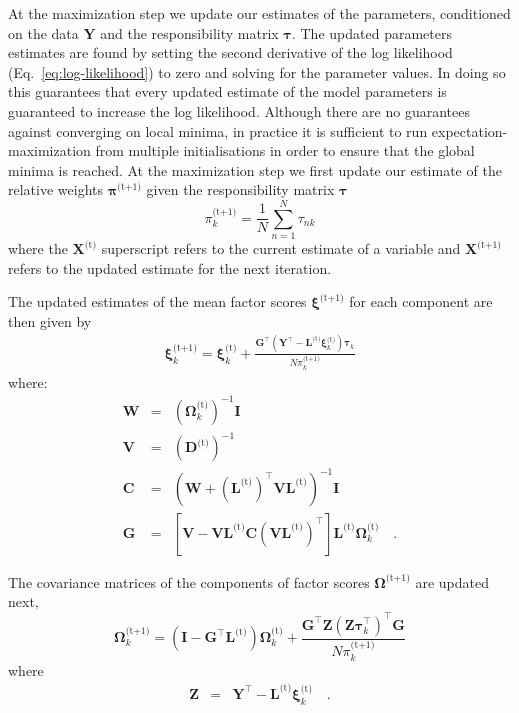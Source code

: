 \documentclass[twocolumn]{aastex62}
\newcommand{\vect}[1]{\boldsymbol{\mathbf{#1}}}
\renewcommand{\vec}[1]{\vect{#1}}
\newcommand{\weight}{\pi}
\newcommand{\data}{\textbf{Y}}
\newcommand{\vecdata}{\vec\data}
\newcommand{\nextstep}{^\textrm{(t+1)}}
\newcommand{\thisstep}{^\textrm{(t)}}
\newcommand{\transpose}{^\intercal}
\newcommand{\eye}{\textbf{I}}
\newcommand{\factorloads}{\textbf{L}}
\newcommand{\specificvariance}{\vec{D}}
\newcommand{\scoremeans}{\vec\xi}
\newcommand{\scorecovs}{\vec\Omega}
\newcommand{\NumData}{N}
\newcommand{\numdata}{n}
\newcommand{\numcomponents}{k}
\begin{document}
At the maximization step we update our estimates of the parameters,
conditioned on the data $\vecdata$ and the responsibility matrix $\vec\tau$.
The updated parameters estimates are found by setting the second derivative
of the log likelihood (Eq.~\ref{eq:log-likelihood}) to zero and solving for
the parameter values. In doing so this guarantees that every updated
estimate of the model parameters is guaranteed to increase the log likelihood.
Although there are no guarantees against converging on local minima, in 
practice it is sufficient to run expectation-maximization from multiple
initialisations in order to ensure that the global minima is reached.
At the maximization step we first update our estimate of the relative weights 
$\vec\weight\nextstep$ given the responsibility matrix $\vec\tau$
\begin{equation}
	\weight_\numcomponents\nextstep = \frac{1}{\NumData} \sum_{\numdata=1}^{\NumData}\tau_{\numdata\numcomponents}
\end{equation}
\noindent{}where the $\vec{X}\thisstep$ superscript refers to the current estimate of a variable
and $\vec{X}\nextstep$ refers to the updated estimate for the next iteration.


The updated estimates of the mean factor scores 
$\scoremeans\nextstep$ for each component are then given by
\begin{eqnarray}
	\scoremeans_\numcomponents\nextstep = \scoremeans_\numcomponents\thisstep + \frac{\vec{G}\transpose(\vecdata\transpose - \factorloads\thisstep\scoremeans_\numcomponents\thisstep)\vec\tau_\numcomponents}{\NumData\weight_\numcomponents\nextstep}
\end{eqnarray}
\noindent{}where:
\begin{eqnarray}
	\vec{W} &=& (\scorecovs_\numcomponents\thisstep)^{-1}\eye \\
	\vec{V} &=& \left(\specificvariance\thisstep\right)^{-1} \\
	\vec{C} &=& (\vec{W} + (\factorloads\thisstep)\transpose\vec{V}\factorloads\thisstep)^{-1}\eye \\
	\vec{G} &=& \left[\vec{V} - \vec{V}\factorloads\thisstep\vec{C}\left(\vec{V}\factorloads\thisstep\right)\transpose\right]\factorloads\thisstep\scorecovs_k\thisstep \quad .
\end{eqnarray}

The covariance matrices of the components of factor scores $\scorecovs\nextstep$
are updated next,
\begin{equation}
	\scorecovs_\numcomponents\nextstep = \left(\eye - \vec{G}\transpose\factorloads\thisstep\right)\scorecovs_\numcomponents\thisstep + \frac{\vec{G}\transpose\vec{Z}\left(\vec{Z}\vec\tau_\numcomponents\transpose\right)\transpose\vec{G}}{N\weight_\numcomponents\nextstep}
\end{equation}
\noindent{}where
\begin{eqnarray}
	\vec{Z} &=& \vecdata\transpose - \factorloads\thisstep\scoremeans_\numcomponents\thisstep \quad .
\end{eqnarray}
\end{document}
